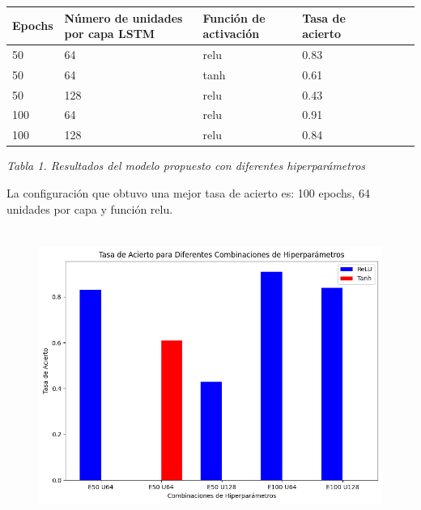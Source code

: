 \documentclass[10pt]{article}
\begin{document}
\begin{table}[H]
\begin{adjustbox}{max width=\textwidth}
\begin{tabular}{p{4.13cm}p{4.13cm}p{4.13cm}p{4.13cm}p{4.13cm}p{4.13cm}p{4.13cm}p{4.13cm}}
\hline
\multicolumn{1}{|p{4.13cm}}{Epochs} & 
\multicolumn{1}{|p{4.13cm}}{Número de unidades por capa LSTM} & 
\multicolumn{1}{|p{4.13cm}}{Función de activación} & 
\multicolumn{1}{|p{4.13cm}|}{Tasa de acierto} \\ 
\hline
\multicolumn{1}{|p{4.13cm}}{50} & 
\multicolumn{1}{|p{4.13cm}}{64} & 
\multicolumn{1}{|p{4.13cm}}{relu} & 
\multicolumn{1}{|p{4.13cm}|}{0.83} \\ 
\hline
\multicolumn{1}{|p{4.13cm}}{50} & 
\multicolumn{1}{|p{4.13cm}}{64} & 
\multicolumn{1}{|p{4.13cm}}{tanh} & 
\multicolumn{1}{|p{4.13cm}|}{0.61} \\ 
\hline
\multicolumn{1}{|p{4.13cm}}{50} & 
\multicolumn{1}{|p{4.13cm}}{128} & 
\multicolumn{1}{|p{4.13cm}}{relu} & 
\multicolumn{1}{|p{4.13cm}|}{0.43} \\ 
\hline
\multicolumn{1}{|p{4.13cm}}{100} & 
\multicolumn{1}{|p{4.13cm}}{64} & 
\multicolumn{1}{|p{4.13cm}}{relu} & 
\multicolumn{1}{|p{4.13cm}|}{0.91} \\ 
\hline
\multicolumn{1}{|p{4.13cm}}{100} & 
\multicolumn{1}{|p{4.13cm}}{128} & 
\multicolumn{1}{|p{4.13cm}}{relu} & 
\multicolumn{1}{|p{4.13cm}|}{0.84} \\ 
\hline
\end{tabular}
\end{adjustbox}
\end{table}
\vspace{2\baselineskip}
\begin{center}
\textit{Tabla 1. Resultados del modelo propuesto con diferentes hiperparámetros}
\end{center}


\vspace{2\baselineskip}
La configuración que obtuvo una mejor tasa de acierto es: 100 epochs, 64 unidades por capa y función relu.

\vspace{1\baselineskip}
\begin{figure}[H]
\centering
\includegraphics[width=12.82cm,height=9.61cm]{./images/image11.png}
\end{figure}
\end{document}
